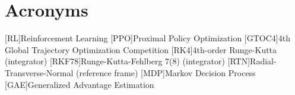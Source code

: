 \chapter*{Acronyms}

\begin{acronym}
  [RL]{Reinforcement Learning}
  [PPO]{Proximal Policy Optimization}
  [GTOC4]{4th Global Trajectory Optimization Competition}
  [RK4]{4th-order Runge-Kutta (integrator)}
  [RKF78]{Runge-Kutta-Fehlberg 7(8) (integrator)}
  [RTN]{Radial-Transverse-Normal (reference frame)}
  [MDP]{Markov Decision Process}
  [GAE]{Generalized Advantage Estimation}
\end{acronym}
